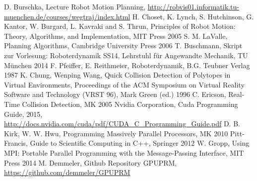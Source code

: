\documentclass[twocolumn]{svjour3}
\begin{document}

\begin{thebibliography}{}%
	 D. Burschka, Lecture Robot Motion Planning, \url{http://robvis01.informatik.tu-muenchen.de/courses/wegtraj/index.html}
	 H. Choset, K. Lynch, S. Hutchinson, G. Kantor, W. Burgard, L. Kavraki and S. Thrun, Principles of Robot Motion: Theory, Algorithms, and Implementation, MIT Press 2005
	 S. M. LaValle, Planning Algorithms, Cambridge University Press 2006
	 T. Buschmann, Skript zur Vorlesung: Roboterdynamik SS14, Lehrstuhl f\"ur Angewandte Mechanik, TU M\"unchen 2014
	 F. Pfeiffer, E. Reithmeier, Roboterdynamik, B.G. Teubner Verlag 1987
	 K. Chung, Wenping Wang, Quick Collision Detection of Polytopes in Virtual Environments, Proceedings of the ACM Symposium on Virtual Reality Software and Technology (VRST 96), Mark Green (ed.) 1996
	 C. Ericson, Real-Time Collision Detection, MK 2005
	 Nvidia Corporation, Cuda Programming Guide, 2015, \url{http://docs.nvidia.com/cuda/pdf/CUDA_C_Programming_Guide.pdf}
	 D. B. Kirk, W. W. Hwu, Programming Massively Parallel Processors, MK 2010
	 Pitt-Francis, Guide to Scientific Computing in C++, Springer 2012
	 W. Gropp, Using MPI: Portable Parallel Programming with the Message-Passing Interface, MIT Press 2014
	 M. Demmeler, Github Repository GPUPRM, \url{https://github.com/demmeler/GPUPRM}
\end{thebibliography}
\end{document}
